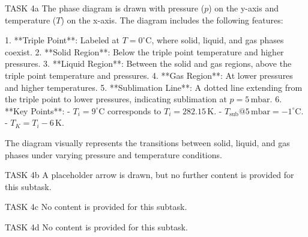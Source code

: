 TASK 4a  
The phase diagram is drawn with pressure (\( p \)) on the y-axis and temperature (\( T \)) on the x-axis. The diagram includes the following features:  

1. **Triple Point**: Labeled at \( T = 0^\circ\text{C} \), where solid, liquid, and gas phases coexist.  
2. **Solid Region**: Below the triple point temperature and higher pressures.  
3. **Liquid Region**: Between the solid and gas regions, above the triple point temperature and pressures.  
4. **Gas Region**: At lower pressures and higher temperatures.  
5. **Sublimation Line**: A dotted line extending from the triple point to lower pressures, indicating sublimation at \( p = 5 \, \text{mbar} \).  
6. **Key Points**:  
   - \( T_i = 9^\circ\text{C} \) corresponds to \( T_i = 282.15 \, \text{K} \).  
   - \( T_{\text{sub}} @ 5 \, \text{mbar} = -1^\circ\text{C} \).  
   - \( T_K = T_i - 6 \, \text{K} \).  

The diagram visually represents the transitions between solid, liquid, and gas phases under varying pressure and temperature conditions.  

TASK 4b  
A placeholder arrow is drawn, but no further content is provided for this subtask.  

TASK 4c  
No content is provided for this subtask.  

TASK 4d  
No content is provided for this subtask.